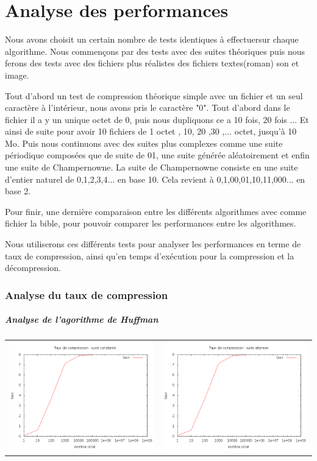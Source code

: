 \documentclass{report}
\begin{document}
\part*{Analyse des performances}
Nous avons choisit un certain nombre de tests identiques à effectuersur chaque algorithme. Nous commençons par des tests avec des suites théoriques puis nous ferons des tests avec des fichiers plus réalistes des fichiers textes(roman) son et image.
 
Tout d'abord un test de compression théorique simple avec un fichier et un seul caractère à l'intérieur, nous avons pris le caractère "0".
Tout d'abord dans le fichier il a y un unique octet de 0, puis nous dupliquons ce a 10 fois, 20 fois ... Et ainsi de suite pour avoir 10 fichiers de 1 octet , 10, 20 ,30 ,...  octet, jusqu'à 10 Mo.
Puis nous continuons avec des suites plus complexes comme une suite périodique composées que de suite de 01, une suite générée aléatoirement et enfin une suite de Champernowne.
La suite de Champernowne consiste en une suite d'entier naturel de 0,1,2,3,4... en base 10. Cela revient à 0,1,00,01,10,11,000... en base 2.   

Pour finir, une dernière comparaison entre les différents algorithmes avec comme fichier la bible, pour pouvoir comparer les performances entre les algorithmes.

Nous utiliserons ces différents tests pour analyser les performances en terme de taux de compression, ainsi qu'en temps d’exécution pour la compression et la décompression. 
\section*{Analyse du taux de compression}
\subsubsection{ Analyse de l'agorithme de Huffman}

\subparagraph*{}
\hspace{-2cm}\begin{tabular}{l | l}
\includegraphics[width=7cm]{HConstant.png} & 
\includegraphics[width=7cm]{alternerH.png}
\end{tabular}
\end{document}
